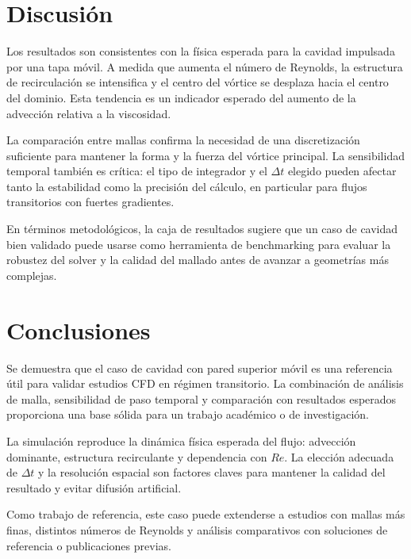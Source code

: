 \documentclass[11pt]{article}
\begin{document}
\section{Discusión}

Los resultados son consistentes con la física esperada para la cavidad impulsada por una tapa móvil. A medida que aumenta el número de Reynolds, la estructura de recirculación se intensifica y el centro del vórtice se desplaza hacia el centro del dominio. Esta tendencia es un indicador esperado del aumento de la advección relativa a la viscosidad.

La comparación entre mallas confirma la necesidad de una discretización suficiente para mantener la forma y la fuerza del vórtice principal. La sensibilidad temporal también es crítica: el tipo de integrador y el $\Delta t$ elegido pueden afectar tanto la estabilidad como la precisión del cálculo, en particular para flujos transitorios con fuertes gradientes.

En términos metodológicos, la caja de resultados sugiere que un caso de cavidad bien validado puede usarse como herramienta de benchmarking para evaluar la robustez del solver y la calidad del mallado antes de avanzar a geometrías más complejas.

\section{Conclusiones}

Se demuestra que el caso de cavidad con pared superior móvil es una referencia útil para validar estudios CFD en régimen transitorio. La combinación de análisis de malla, sensibilidad de paso temporal y comparación con resultados esperados proporciona una base sólida para un trabajo académico o de investigación.

La simulación reproduce la dinámica física esperada del flujo: advección dominante, estructura recirculante y dependencia con $Re$. La elección adecuada de $\Delta t$ y la resolución espacial son factores claves para mantener la calidad del resultado y evitar difusión artificial.

Como trabajo de referencia, este caso puede extenderse a estudios con mallas más finas, distintos números de Reynolds y análisis comparativos con soluciones de referencia o publicaciones previas.
\end{document}
